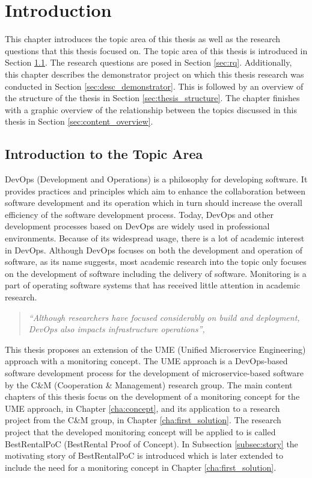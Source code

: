 \chapter{Introduction}
\label{cha:introduction}

This chapter introduces the topic area of this thesis as well as the research questions
that this thesis focused on. The topic area of this thesis is introduced in Section \ref{sec:intro_topic}.
The research questions are posed in Section \ref{sec:rq}. Additionally,
this chapter describes the demonstrator project on which this thesis research
was conducted in Section \ref{sec:desc_demonstrator}. This is followed by an overview
of the structure of the thesis in Section \ref{sec:thesis_structure}. The chapter finishes
with a graphic overview of the relationship between the topics discussed in this thesis
in Section \ref{sec:content_overview}.

\section{Introduction to the Topic Area}
\label{sec:intro_topic}

DevOps (Development and Operations) is a philosophy for developing software. It provides practices
and principles which aim to enhance the collaboration between software development and its operation
which in turn should increase the overall efficiency of the software development process.
Today, DevOps and other development processes based on DevOps are widely used in professional environments.
Because of its widespread usage, there is a lot of academic interest in DevOps. Although DevOps focuses
on both the development and operation of software, as its name suggests, most academic research
into the topic only focuses on the development of software including the delivery of software.
Monitoring is a part of operating software systems that has received little attention in academic research.

\begin{quote}
\textit{``Although researchers have focused considerably on build and deployment,
DevOps also impacts infrastructure operations'', \cite{EG+16}}
\end{quote}

This thesis proposes an extension of the UME (Unified Microservice Engineering) approach with a monitoring concept.
The UME approach is a DevOps-based software development process for the development of microservice-based
software by the C\&M (Cooperation \& Management) research group. The main content chapters of this thesis
focus on the development of a monitoring concept for the UME approach, in Chapter \ref{cha:concept},
and its application to a research project from the C\&M group, in Chapter \ref{cha:first_solution}.
The research project that the developed monitoring concept will be applied to is called
BestRentalPoC (BestRental Proof of Concept).
In Subsection \ref{subsec:story} the motivating story of BestRentalPoC is introduced which is later extended
to include the need for a monitoring concept in Chapter \ref{cha:first_solution}.

